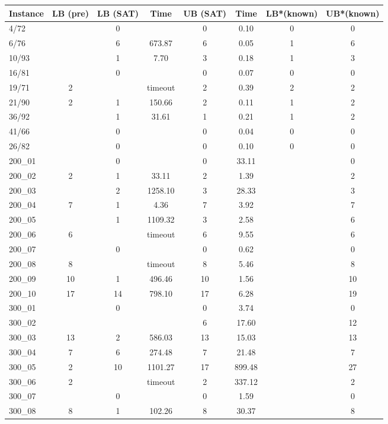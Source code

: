 \begin{tabular}{ l|c|cc|cc|cc  }
Instance &LB (pre)	&LB (SAT)	&Time &UB (SAT)	&Time & LB*(known)   & UB*(known) \\
    \hline
4/72	&	&0	&	&0	&0.10	&0	&0	\\
6/76	&	&6	&673.87	&6	&0.05	&1	&6	\\
10/93	&	&1	&7.70	&3	&0.18	&1	&3	\\
16/81	&	&0	&	&0	&0.07	&0	&0	\\
19/71	&2	&	& timeout &2	&0.39	&2	&2	\\
21/90	&2	&1	&150.66	&2	&0.11	&1	&2	\\
36/92	&	&1	&31.61	&1	&0.21	&1	&2	\\
41/66	&	&0	&	&0	&0.04	&0	&0	\\
26/82	&	&0	&	&0	&0.10	&0	&0	\\
200\_01	&	&0	&	&0	&33.11	&	&0	\\
200\_02	&2	&1	&33.11  &2	&1.39	&	&2	\\
200\_03	&	&2	&1258.10	&3	&28.33	&	&3	\\
200\_04	&7	&1	&4.36	&7	&3.92	&	&7	\\
200\_05	&	&1	&1109.32	&3	&2.58	&	&6	\\
200\_06	&6	&	& timeout  &6	&9.55	&	&6	\\
200\_07	&	&0	&	&0	&0.62	&	&0	\\
200\_08	&8	&	& timeout  &8	&5.46	&	&8	\\
200\_09	&10	&1	&496.46	&10	&1.56	&	&10	\\
200\_10	&17	&14	&798.10	&17	&6.28	&	&19	\\
300\_01	&	&0	&	&0	&3.74	&	&0	\\
300\_02	&	&	&	&6	&17.60	&	&12	\\
300\_03	&13	&2	&586.03	&13	&15.03	&	&13	\\
300\_04	&7	&6	&274.48	&7	&21.48	&	&7	\\
300\_05	&2	&10	&1101.27	&17	&899.48	&	&27	\\
300\_06	&2	&	& timeout  &2	&337.12	&	&2	\\
300\_07	&	&0	&	&0	&1.59	&	&0	\\
300\_08	&8	&1	&102.26	&8	&30.37	&	&8	\\

\end{tabular}

